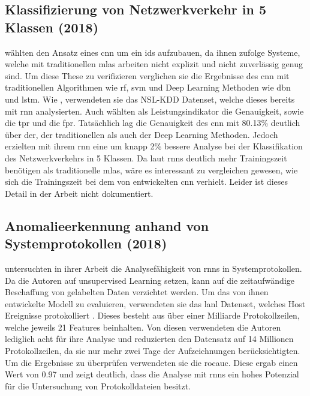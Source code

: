 \documentclass[
    12pt, %
    DIV10,
    ngerman, %
    a4paper, %
    oneside, %
    titlepage, %
    parskip=half, %
    headings=normal, %
    listof=totoc, %
    bibliography=totoc, %
    index=totoc, %
    captions=tableheading, %
    final %
]{scrreprt}
\begin{document}
\subsection{Klassifizierung von Netzwerkverkehr in 5 Klassen (2018)}\label{ding}
\textcite{Ding2018} wählten den Ansatz eines \ac{cnn} um ein \ac{ids} aufzubauen, da ihnen zufolge Systeme, welche mit traditionellen \ac{mlas} arbeiten nicht explizit und nicht zuverlässig genug sind. Um diese These zu verifizieren verglichen sie die Ergebnisse des \ac{cnn} mit traditionellen Algorithmen wie \ac{rf}, \ac{svm} und Deep Learning Methoden wie \ac{dbn} und \ac{lstm}. Wie \textcite{Yin2017}, verwendeten sie das NSL-KDD Datenset, welche dieses bereits mit \ac{rnn} analysierten. Auch \textcite{Ding2018} wählten als Leistungsindikator die Genauigkeit, sowie die \ac{tpr} und die \ac{fpr}. Tatsächlich lag die Genauigkeit des \ac{cnn} mit 80.13\% deutlich über der, der traditionellen als auch der Deep Learning Methoden. Jedoch erzielten \textcite{Yin2017} mit ihrem \ac{rnn} eine um knapp 2\% bessere Analyse bei der Klassifikation des Netzwerkverkehrs in 5 Klassen. Da laut \textcite{Yin2017} \ac{rnns} deutlich mehr Trainingszeit benötigen als traditionelle \ac{mlas}, wäre es interessant zu vergleichen gewesen, wie sich die Trainingszeit bei dem von \textcite{Ding2018} entwickelten \ac{cnn} verhielt. Leider ist dieses Detail in der Arbeit nicht dokumentiert.
%
\subsection{Anomalieerkennung anhand von Systemprotokollen (2018)}\label{brown}
\textcite{Brown2018} untersuchten in ihrer Arbeit die Analysefähigkeit von \ac{rnns} in Systemprotokollen. Da die Autoren auf unsupervised Learning setzen, kann auf die zeitaufwändige Beschaffung von gelabelten Daten verzichtet werden. Um das von ihnen entwickelte Modell zu evaluieren, verwendeten sie das \ac{lanl} Datenset, welches Host Ereignisse protokolliert \parencite{akent-2015-enterprise-data}. Dieses besteht aus über einer Milliarde Protokollzeilen, welche jeweils 21 Features beinhalten. Von diesen verwendeten die Autoren lediglich acht für ihre Analyse und reduzierten den Datensatz auf 14 Millionen Protokollzeilen, da sie nur mehr zwei Tage der Aufzeichnungen berücksichtigten. Um die Ergebnisse zu überprüfen verwendeten sie die \ac{rocauc}. Diese ergab einen Wert von 0.97 und zeigt deutlich, dass die Analyse mit \ac{rnns} ein hohes Potenzial für die Untersuchung von Protokolldateien besitzt.
%
\end{document}
